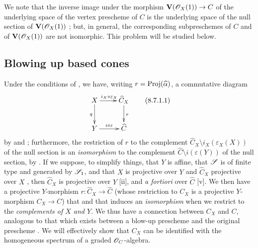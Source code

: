 We note that the inverse image under the morphism $\bb{V}(\sh{O}_X(1))\to C$ of the underlying space of the vertex prescheme of $C$ is the underlying space of the null section of $\mathbf{V}(\mathscr{O}_X(1))$ ;
but, in general, the corresponding subpreschemes of $C$ and of $\mathbf{V}(\mathscr{O}_X(1))$ are not isomorphic.
This problem will be studied below.


\subsection{Blowing up based cones}
\label{subsection:II.8.7}

\begin{env}[8.7.1]
\label{II.8.7.1}
Under the conditions of , we have, writing $r=\operatorname{Proj}(\widehat{\alpha})$, a commutative diagram
\[
\label{II.8.7.1.1}
  \xymatrix{
    X
      \ar[r]^{i_X\circ\varepsilon_X}
      \ar[d]_{q}
  & \widehat{C}_X
      \ar[d]^{r}
  \\Y
      \ar[r]^{i\circ\varepsilon}
  & \widehat{C}
  }
\tag{8.7.1.1}
\]
by  and ;
furthermore, the restriction of $r$ to the complement $\widehat{C}_X\setminus i_X(\varepsilon_X(X))$ of the null section is an \emph{isomorphism} to the complement $\widehat{C}\setminus i(\varepsilon(Y))$ of the null section, by .
If we suppose, to simplify things, that $Y$ is affine, that $\mathscr{S}$ is of finite type and generated by $\mathscr{S}_1$, and that $X$ is projective over $Y$ and $\widehat{C}_X$ projective over $X$ , then $\widehat{C}_X$ is projective over $Y$ [ii], and \emph{a fortiori} over $\widehat{C}$ [v].
We then have a projective $Y$-morphism $r:\widehat{C}_X\to\widehat{C}$ (whose restriction to $C_X$ is a projective $Y$-morphism $C_X\to C$) that  and that induces an \emph{isomorphism} when we restrict to the \emph{complements of $X$ and $Y$}.
We thus have a connection between $C_X$ and $C$, analogous to that which exists between a blow-up prescheme and the original prescheme .
We will effectively show that $C_X$ can be identified with the homogeneous spectrum of a graded $\mathscr{O}_C$-algebra.
\end{env}


